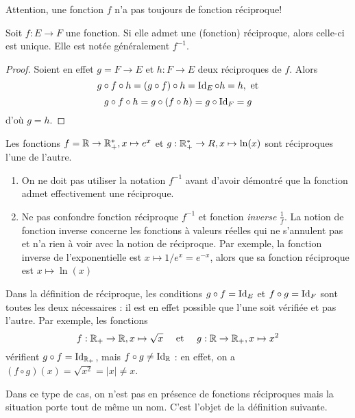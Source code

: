 Attention, une fonction $f$ n'a pas toujours de fonction réciproque!

\begin{proposition} Soit $f : E\to F$ une fonction. Si elle admet une (fonction) réciproque, alors celle-ci est unique. Elle est notée généralement $f^{-1}$.
\end{proposition}
\begin{proof}
Soient en effet $g = F\to E$ et $h : F \to E$ deux réciproques de $f$. Alors
\[
g\circ  f \circ h = (g\circ f) \circ h = \operatorname{Id}_E \circ h = h, \text{ et}
\]
\[
g\circ  f \circ h = g\circ (f \circ h) = g \circ \operatorname{Id}_F = g
\]
d'où $g=h$.
\end{proof}



\begin{exemple}
Les fonctions $f = \mathbb{R}\to \mathbb{R}_+^*, x\mapsto e^x$ et $g : \mathbb{R}_+^*\to R, x\mapsto \ln(x)$ sont réciproques l'une de l'autre.
\end{exemple}

\begin{attention}
\begin{enumerate}
\item On ne doit pas utiliser la notation $f^{-1}$ avant d'avoir démontré que la fonction admet effectivement une réciproque.
\item Ne pas confondre fonction réciproque $f^{-1}$ et fonction \emph{inverse} $\frac{1}{f}$. La notion de fonction inverse  concerne les fonctions à valeurs réelles qui ne s'annulent pas et n'a rien à voir avec la notion de réciproque. Par exemple, la fonction inverse de l'exponentielle est $x\mapsto 1/e^x = e^{-x}$, alors que sa fonction réciproque est $x\mapsto \ln(x)$
\end{enumerate}
\end{attention}

\begin{attention}
Dans la définition de réciproque, les conditions $g\circ f = \operatorname{Id}_E$ et  $f\circ g = \operatorname{Id}_F$ sont toutes les deux nécessaires : il est en effet possible que l'une soit vérifiée et pas l'autre. Par exemple, les fonctions 
\[
f : \mathbb{R}_+\to \mathbb{R}, x\mapsto \sqrt x
\quad \text{ et }\quad
g : \mathbb{R}\to \mathbb{R}_+, x\mapsto x^2
\]
vérifient $g\circ f=\operatorname{Id}_{\mathbb{R}_+}$, mais $f\circ g \neq \operatorname{Id}_{\mathbb{R}}$ : en effet, on a $(f\circ g)(x)=\sqrt{x^2}=|x|\neq x$.

Dans ce type de cas, on n'est pas en présence de fonctions réciproques mais la situation porte tout de même un nom. C'est l'objet de la définition suivante.
\end{attention}

